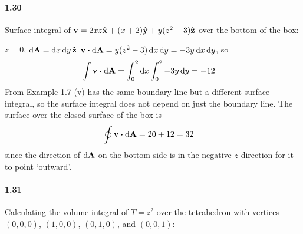 \documentclass[../main.tex]{subfiles}
\begin{document}
\paragraph{1.30}
Surface integral of $\vb{v} = 2xz\vu{x} + (x+2)\vu{y} + y(z^2-3)\vu{z}$ over the bottom of the box:

$z = 0$, $\dd{\vb{A}} = \dd{x}\dd{y} \vu{z}$
$\vb{v} \vdot \dd{\vb{A}} = y(z^2-3) \dd{x}\dd{y} = -3y \dd{x}\dd{y}$, so
\begin{align*}
    \int \vb{v} \vdot \dd{\vb{A}} &= \int_0^2 \dd{x} \int_0^2 -3y \dd{y} = -12
\end{align*}
From Example 1.7 (v) has the same boundary line but a different surface integral, so the surface
integral does not depend on just the boundary line. The surface over the closed surface of the box 
is 
\begin{align*}
    \oint \vb{v} \vdot \dd{\vb{A}} &= 20 + 12 = 32
\end{align*}
since the direction of $\dd{\vb{A}}$ on the bottom side is in the negative $z$ direction for it to
point `outward'.

\paragraph{1.31}
Calculating the volume integral of $T = z^2$ over the tetrahedron with vertices $(0,0,0)$,
$(1,0,0)$, $(0,1,0)$, and $(0,0,1)$:
\end{document}
